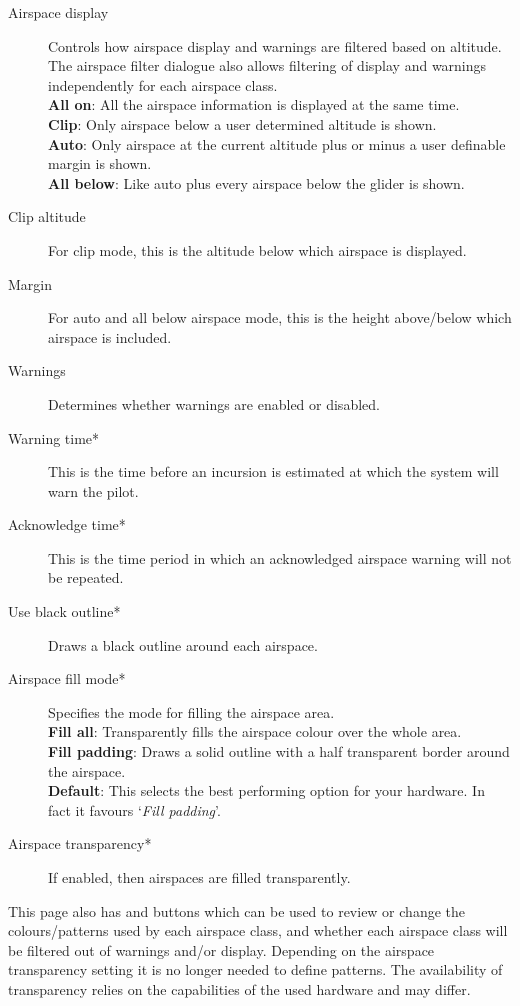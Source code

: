 \begin{description}
\item[Airspace display]  Controls how airspace display and warnings are filtered 
  based on altitude.  The airspace filter dialogue also allows filtering
  of display and warnings independently for each airspace class. \\
  {\bf All on}: All the airspace information is displayed at the same time. \\
  {\bf Clip}: Only airspace below a user determined altitude is shown. \\
  {\bf Auto}: Only airspace at the current altitude plus or minus a user 
    definable margin is shown.
 \\
  {\bf All below}:  Like auto plus every airspace below the glider is shown.
\item[Clip altitude] For clip mode, this is the altitude below which airspace 
  is displayed.
\item[Margin]  For auto and all below airspace mode, this is the height 
  above/below which airspace is included.
\item[Warnings]  Determines whether warnings are enabled or disabled.
\item[Warning time*]  This is the time before an incursion is estimated at
  which the system will warn the pilot.
\item[Acknowledge time*]  This is the time period in which an acknowledged airspace 
  warning will not be repeated.
\item[Use black outline*]  Draws a black outline around each airspace.
\item[Airspace fill mode*]  Specifies the mode for filling the airspace area. \\
  {\bf Fill all}:  Transparently fills the airspace colour over the whole area. \\
  {\bf Fill padding}: Draws a solid outline with a half transparent border 
    around the airspace. \\
  {\bf Default}:  This selects the best performing option for your hardware. In fact 
    it favours `{\it Fill padding}'.
\item[Airspace transparency*]  If enabled, then airspaces are filled transparently.
\end{description}

This page also has  and  buttons which
can be used to review or change the colours/patterns used by each
airspace class, and whether each airspace class will be filtered out
of warnings and/or display. Depending on the airspace transparency setting it is 
no longer needed to define patterns. The availability of transparency relies 
on the capabilities of the used hardware and may differ. 


